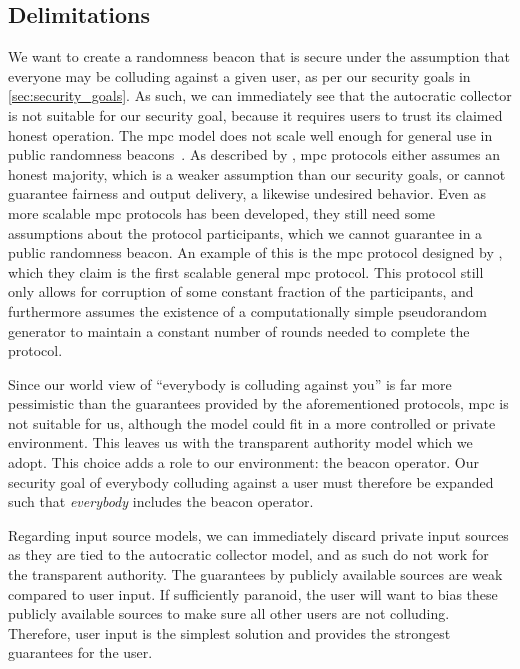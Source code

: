 \subsection{Delimitations}%
\label{sub:delimitations}
We want to create a randomness beacon that is secure under the assumption that everyone may be colluding against a given user, as per our security goals in \cref{sec:security_goals}.
As such, we can immediately see that the autocratic collector is not suitable for our security goal, because it requires users to trust its claimed honest operation.
The \gls{mpc} model does not scale well enough for general use in public randomness beacons~\cite{syta2017scalable}.
As described by \citet{damgaard2006scalable}, \gls{mpc} protocols either assumes an honest majority, which is a weaker assumption than our security goals, or cannot guarantee fairness and output delivery, a likewise undesired behavior.
Even as more scalable \gls{mpc} protocols has been developed, they still need some assumptions about the protocol participants, which we cannot guarantee in a public randomness beacon.
An example of this is the \gls{mpc} protocol designed by \citet{damgaard2006scalable}, which they claim is the first scalable general \gls{mpc} protocol.
This protocol still only allows for corruption of some constant fraction of the participants, and furthermore assumes the existence of a computationally simple pseudorandom generator to maintain a constant number of rounds needed to complete the protocol.

Since our world view of \enquote{everybody is colluding against you} is far more pessimistic than the guarantees provided by the aforementioned protocols, \gls{mpc} is not suitable for us, although the model could fit in a more controlled or private environment.
This leaves us with the transparent authority model which we adopt.
This choice adds a role to our environment: the beacon operator.
Our security goal of everybody colluding against a user must therefore be expanded such that \emph{everybody} includes the beacon operator.

Regarding input source models, we can immediately discard private input sources as they are tied to the autocratic collector model, and as such do not work for the transparent authority.
The guarantees by publicly available sources are weak compared to user input.
If sufficiently paranoid, the user will want to bias these publicly available sources to make sure all other users are not colluding.
Therefore, user input is the simplest solution and provides the strongest guarantees for the user.

